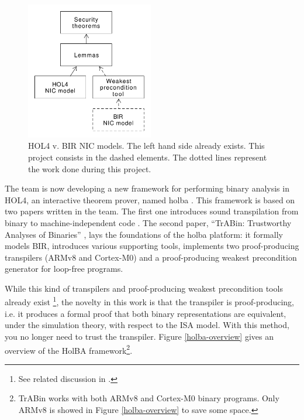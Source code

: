\documentclass[10pt,a4paper]{article}
\begin{document}
\begin{figure}[H]
	\includegraphics[height=6cm]{figures/hol-v-bir-nic-model-simple.png}
	\caption{HOL4 v. BIR NIC models. The left hand side already exists. This project consists in the dashed elements. The dotted lines represent the work done during this project.}
	\label{hol-v-bir-nic-model-simple}
\end{figure}

The team is now developing a new framework for performing binary analysis in HOL4, an interactive theorem prover, named {holba} \cite{noauthor_holba_2019}. This framework is based on two papers written in the team. The first one introduces sound {transpilation} from binary to machine-independent code \footnotemark \cite{metere_sound_2017}. The second paper, ``TrABin: Trustworthy Analyses of Binaries'' \cite{lindner_trabin:_2019}, lays the foundations of the {holba} platform: it formally models {BIR}, introduces various supporting tools, implements two {proof-producing} {transpilers} (ARMv8 and Cortex-M0) and a proof-producing weakest precondition generator for loop-free programs.


While this kind of {transpilers} and {proof-producing} weakest precondition tools already exist \footnote{See related discussion in \cite{lindner_trabin:_2019}.}, the novelty in this work is that the transpiler is proof-producing, i.e. it produces a formal proof that both binary representations are equivalent, under the simulation theory, with respect to the {ISA} model. With this method, you no longer need to trust the transpiler. Figure \ref{holba-overview} gives an overview of the HolBA framework\footnote{TrABin works with both ARMv8 and Cortex-M0 binary programs. Only ARMv8 is showed in Figure \ref{holba-overview} to save some space.}.
\end{document}
